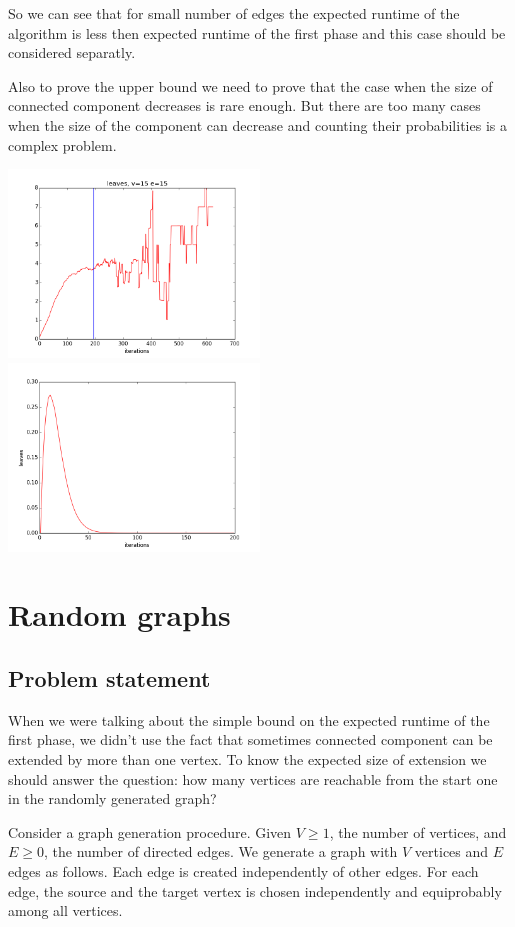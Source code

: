 \documentclass{llncs}
\begin{document}
  So we can see that for small number of edges the expected runtime of the algorithm is less then expected runtime of the first phase and this case should be considered separatly.
  
  Also to prove the upper bound we need to prove that the case when the size of connected component decreases is rare enough.
  But there are too many cases when the size of the component can decrease and counting their probabilities is a complex problem.
  
  
  \includegraphics[height=5cm]{pic/leaves_v15e15.png}
  \includegraphics[height=5cm]{pic/firstPart.png}
  
 \section{Random graphs}
 \subsection{Problem statement}
  When we were talking about the simple bound on the expected runtime of the first phase, we didn't use the fact that sometimes connected component can be extended by more than one vertex. To know the expected size of extension we should answer the question: how many vertices are reachable from the start one in the randomly generated graph?
  
  Consider a graph generation procedure.
  Given $V \ge 1$, the number of vertices, and $E \ge 0$, the number of directed edges.
  We generate a graph with $V$ vertices and $E$ edges as follows. Each edge is created independently 
  of other edges. For each edge, the source and the target vertex is chosen 
  independently and equiprobably among all vertices.
  
\end{document}
